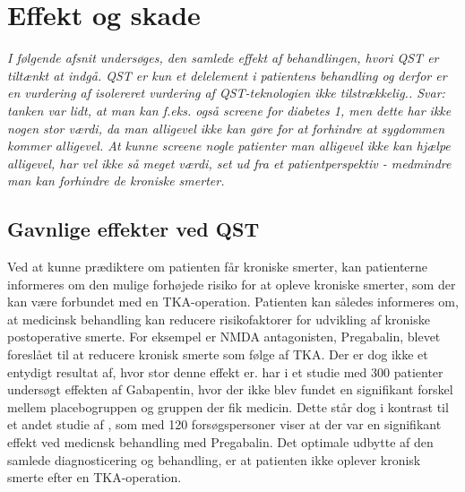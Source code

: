 \section{Effekt og skade}
\textit{I følgende afsnit undersøges, den samlede effekt af behandlingen, hvori QST er tiltænkt at indgå. QST er kun et delelement i patientens behandling og derfor er en vurdering af isolereret vurdering af QST-teknologien ikke tilstrækkelig.. Svar: tanken var lidt, at man kan f.eks. også screene for diabetes 1, men dette har ikke nogen stor værdi, da man alligevel ikke kan gøre for at forhindre at sygdommen kommer alligevel. At kunne screene nogle patienter man alligevel ikke kan hjælpe alligevel, har vel ikke så meget værdi, set ud fra et patientperspektiv - medmindre man kan forhindre de kroniske smerter.}

\subsection{Gavnlige effekter ved QST} 
Ved at kunne prædiktere om patienten får kroniske smerter, kan patienterne informeres om den mulige forhøjede risiko for at opleve kroniske smerter, som der kan være forbundet med en TKA-operation. Patienten kan således informeres om, at medicinsk behandling kan reducere risikofaktorer for udvikling af kroniske postoperative smerte.%
For eksempel er NMDA antagonisten, Pregabalin, blevet foreslået til at reducere kronisk smerte som følge af TKA. Der er dog ikke et entydigt resultat af, hvor stor denne effekt er.  har i et studie med 300 patienter undersøgt effekten af Gabapentin, hvor der ikke blev fundet en signifikant forskel mellem placebogruppen og gruppen der fik medicin. Dette står dog i kontrast til et andet studie af , som med 120 forsøgspersoner viser at der var en signifikant effekt ved medicnsk behandling med Pregabalin. 
Det optimale udbytte af den samlede diagnosticering og behandling, er at patienten ikke oplever kronisk smerte efter en TKA-operation. %

